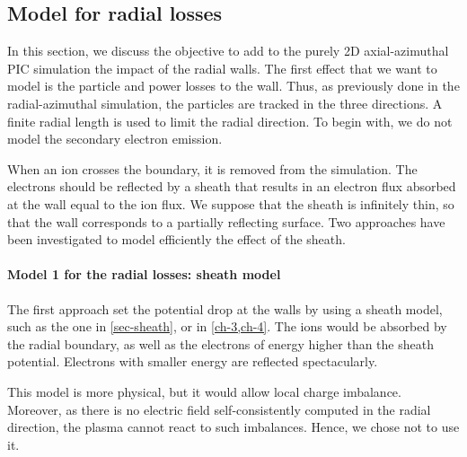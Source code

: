 
\subsection{Model for radial losses} \label{subsec-fakeR}

In this section, we discuss the objective to add to the purely \ac{2D} axial-azimuthal \ac{PIC} simulation the impact of the radial walls.
The first effect that we want to model is the particle and power losses to the wall.
Thus, as previously done in the radial-azimuthal simulation, the particles are tracked in the three directions.
A finite radial length is used to limit the radial direction.
To begin with, we do not model the secondary electron emission.

When an ion crosses the boundary, it is removed from the simulation.
The electrons should be reflected by a sheath that results in an electron flux absorbed at the wall equal to the ion flux.
We suppose that the sheath is infinitely thin, so that the wall corresponds to a partially reflecting surface.
Two approaches have been investigated to model efficiently the effect of the sheath.


\paragraph{ Model 1 for the radial losses\string: sheath model\\}
The first approach set the potential drop at the walls by using  a sheath model, such as the one in \cref{sec-sheath}, or in \cref{ch-3,ch-4}.
The ions would be absorbed by the radial boundary, as well as the electrons of energy higher than the sheath potential.
Electrons with smaller energy are reflected spectacularly.

This model is more physical, but it would allow local charge imbalance.
Moreover, as there is no electric field self-consistently computed in the radial direction, the plasma cannot react to such imbalances.
Hence, we chose not to use it.

